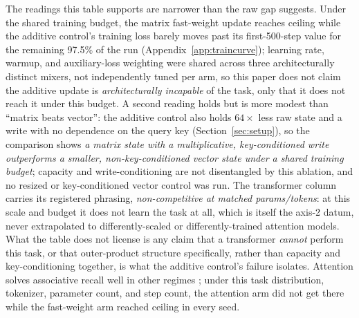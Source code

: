 The readings this table supports are narrower than the raw gap suggests.
Under the shared training budget, the matrix fast-weight update reaches
ceiling while the additive control's training loss barely moves past its
first-500-step value for the remaining 97.5\% of the run
(Appendix~\ref{app:traincurve}); learning rate, warmup, and
auxiliary-loss weighting were shared across three architecturally
distinct mixers, not independently tuned per arm, so this paper does not
claim the additive update is \emph{architecturally incapable} of the
task, only that it does not reach it under this budget. A second reading
holds but is more modest than ``matrix beats vector'': the additive
control also holds $64\times$ less raw state and a write with no
dependence on the query key (Section~\ref{sec:setup}), so the comparison
shows \emph{a matrix state with a multiplicative, key-conditioned
write outperforms a smaller, non-key-conditioned vector state under a
shared training budget}; capacity and write-conditioning are not
disentangled by this ablation, and no resized or key-conditioned vector
control was run. The transformer column carries its registered phrasing,
\emph{non-competitive at matched params/tokens}: at this scale and budget
it does not learn the task at all, which is itself the axis-2 datum,
never extrapolated to differently-scaled or differently-trained attention
models. What the table does not license is any claim that a transformer
\emph{cannot} perform this task, or that outer-product structure
specifically, rather than capacity and key-conditioning together, is
what the additive control's failure isolates. Attention solves
associative recall well in other regimes \citep{arora2023zoology,
nichani2024understanding}; under this task distribution, tokenizer,
parameter count, and step count, the attention arm did not get there
while the fast-weight arm reached ceiling in every seed.


